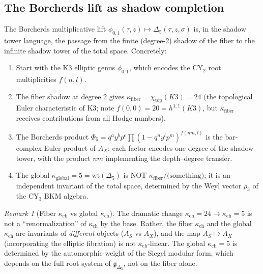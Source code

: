 \documentclass[11pt]{article}
\theoremstyle{plain}
\theoremstyle{definition}
\theoremstyle{remark}
\newtheorem{remark}[theorem]{Remark}
\newcommand{\CY}{\mathrm{CY}}
\begin{document}
\subsection{The Borcherds lift as shadow completion}

The Borcherds multiplicative lift
$\phi_{0,1}(\tau, z) \mapsto \Delta_5(\tau, z, \sigma)$
is, in the shadow tower language, the passage from the
finite (degree-2) shadow of the fiber to the infinite shadow
tower of the total space. Concretely:

\begin{enumerate}[label=(\roman*)]
 \item Start with the K3 elliptic genus $\phi_{0,1}$, which
 encodes the $\CY_2$ root multiplicities $f(n,l)$.

 \item The fiber shadow at degree 2 gives
 $\kappa_{\text{fiber}} = \chi_{\mathrm{top}}(K3) = 24$
 (the topological Euler characteristic of K3; note
 $f(0,0) = 20 = h^{1,1}(K3)$, but $\kappa_{\text{fiber}}$
 receives contributions from all Hodge numbers).

 \item The Borcherds product
 $\Phi_5 = q^a y^b p^c \prod (1 - q^n y^l p^m)^{f(nm,l)}$
 is the bar-complex Euler product of $A_X$: each factor
 encodes one degree of the shadow tower, with the product
 $nm$ implementing the depth--degree transfer.

 \item The global $\kappa_{\text{global}} = 5 = \mathrm{wt}(\Delta_5)$
 is NOT $\kappa_{\text{fiber}}/\text{(something)}$; it is
 an independent invariant of the total space, determined by
 the Weyl vector $\rho_3$ of the $\CY_3$ BKM algebra.
\end{enumerate}

\begin{remark}[Fiber $\kappa_{\mathrm{ch}}$ vs global $\kappa_{\mathrm{ch}}$]
The dramatic change $\kappa_{\mathrm{ch}} = 24 \to \kappa_{\mathrm{ch}} = 5$ is not a
``renormalization'' of $\kappa_{\mathrm{ch}}$ by the base. Rather, the
fiber $\kappa_{\mathrm{ch}}$ and the global $\kappa_{\mathrm{ch}}$ are invariants of
\emph{different} objects ($A_S$ vs $A_X$), and the map
$A_S \mapsto A_X$ (incorporating the elliptic fibration) is
not $\kappa_{\mathrm{ch}}$-linear. The global $\kappa_{\mathrm{ch}} = 5$ is determined
by the automorphic weight of the Siegel modular form, which
depends on the full root system of $\mathfrak{g}_{\Delta_5}$,
not on the fiber alone.
\end{remark}
\end{document}

